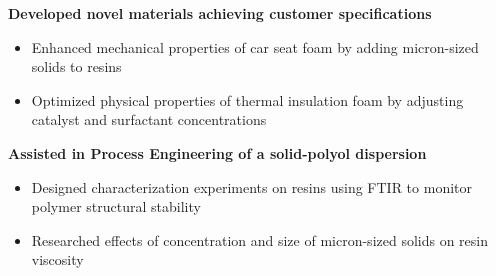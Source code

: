 \begin{cventries}
{\begin{cvitems}
        \item \textbf{Developed novel materials achieving customer specifications}
        \vspace{0.05cm}
        \begin{itemize}
            \item Enhanced mechanical properties of car seat foam by adding micron-sized solids to resins
            \item Optimized physical properties of thermal insulation foam by adjusting catalyst and surfactant concentrations
            \vspace{0.05cm}
        \end{itemize}
        \item \textbf{Assisted in Process Engineering of a solid-polyol dispersion}
        \begin{itemize}
            \item Designed characterization experiments on resins using FTIR to monitor polymer structural stability 
            \item Researched effects of concentration and size of micron-sized solids on resin viscosity 
            \vspace{0.05cm}
        \end{itemize}
      \end{cvitems}
    }

\end{cventries}
